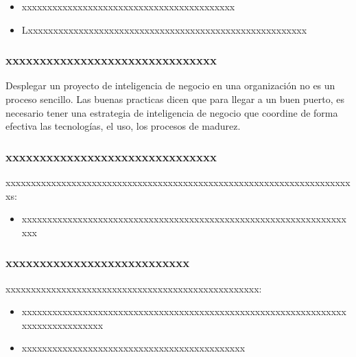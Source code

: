 \documentclass[preprint,12pt]{elsarticle}
\begin{document}
	\begin{itemize}
	\item xxxxxxxxxxxxxxxxxxxxxxxxxxxxxxxxxxxxxxxxxx
	\item Lxxxxxxxxxxxxxxxxxxxxxxxxxxxxxxxxxxxxxxxxxxxxxxxxxxxxxxx

	\end{itemize}

	\subsubsection{\textbf{xxxxxxxxxxxxxxxxxxxxxxxxxxxxxxx}}
	Desplegar un proyecto de inteligencia de negocio en una organización no es un proceso sencillo. Las buenas practicas dicen 
	que para llegar a un buen puerto, es necesario tener una estrategia de inteligencia de negocio que coordine de forma efectiva 
	las tecnologías, el uso, los procesos de madurez.\cite{referenciarobles2}
	\subsubsection{\textbf{xxxxxxxxxxxxxxxxxxxxxxxxxxxxxxx}}
	xxxxxxxxxxxxxxxxxxxxxxxxxxxxxxxxxxxxxxxxxxxxxxxxxxxxxxxxxxxxxxxxxxxxxs:

	\begin{itemize}
	\item xxxxxxxxxxxxxxxxxxxxxxxxxxxxxxxxxxxxxxxxxxxxxxxxxxxxxxxxxxxxxxxxxxx
	\end{itemize}


	\subsubsection{\textbf{xxxxxxxxxxxxxxxxxxxxxxxxxxx}}
	xxxxxxxxxxxxxxxxxxxxxxxxxxxxxxxxxxxxxxxxxxxxxxxxxx:

	\begin{itemize}
	\item xxxxxxxxxxxxxxxxxxxxxxxxxxxxxxxxxxxxxxxxxxxxxxxxxxxxxxxxxxxxxxxxxxxxxxxxxxxxxxxx
	\item  xxxxxxxxxxxxxxxxxxxxxxxxxxxxxxxxxxxxxxxxxxxx
	
	\end{itemize}



\end{document}
